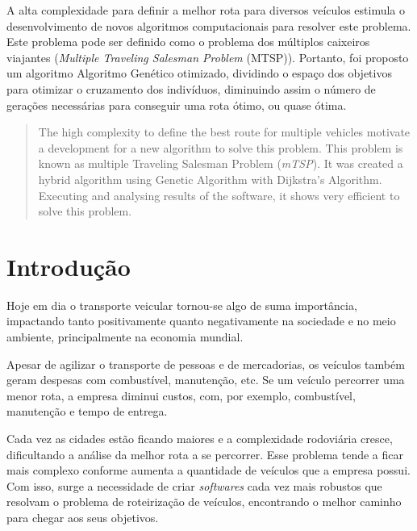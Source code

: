 \documentclass{abnt}
\begin{document}
	\sumario 
	

	
	
	\listadefiguras
	
	\begin{resumo}
		A alta complexidade para definir a melhor rota para diversos veículos estimula o desenvolvimento de novos algoritmos computacionais para resolver este problema. Este problema pode ser definido como o problema dos múltiplos caixeiros viajantes (\textit{Multiple Traveling Salesman Problem} (MTSP)). Portanto, foi proposto um algoritmo Algoritmo Genético otimizado, dividindo o espaço dos objetivos para otimizar o cruzamento dos indivíduos, diminuindo assim o número de gerações necessárias para conseguir uma rota ótimo, ou quase ótima.

	\end{resumo}

	\begin{abstract}
		The high complexity to define the best route for multiple vehicles motivate a development for a new algorithm to solve this problem. This problem is known as multiple Traveling Salesman Problem (\textit{mTSP}). It was created a hybrid algorithm using Genetic Algorithm with Dijkstra's Algorithm. Executing and analysing results of the software, it shows very efficient to solve this problem.  
	\end{abstract}

	\chapter{Introdução}
		
		Hoje em dia o transporte veicular tornou-se algo de suma importância, 
		impactando tanto positivamente quanto negativamente na sociedade e no meio ambiente, principalmente na economia mundial. 
		
		Apesar de agilizar o transporte de pessoas e  de mercadorias, 
		os veículos também geram despesas com combustível, manutenção, etc. 
		Se um veículo percorrer uma menor rota, a empresa diminui custos, com, por exemplo, 
		combustível, manutenção e tempo de entrega.

		Cada vez as cidades estão ficando maiores e a complexidade rodoviária cresce, dificultando a
		análise da melhor rota a se percorrer. Esse problema tende a ficar mais complexo conforme 
		aumenta a quantidade de veículos que a empresa possui. Com isso, surge a necessidade de criar 
		\textit{softwares} cada vez mais robustos que resolvam o problema de roteirização de veículos, encontrando o melhor caminho para chegar aos seus objetivos.
\end{document}
